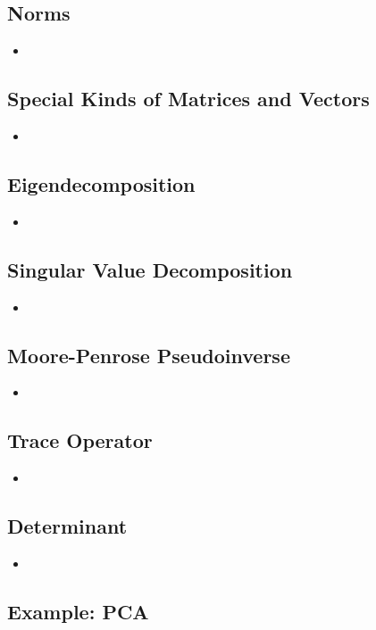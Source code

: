 \subsection{Norms}
\begin{itemize}
    \item 
\end{itemize}

\subsection{Special Kinds of Matrices and Vectors}
\begin{itemize}
    \item 
\end{itemize}

\subsection{Eigendecomposition}
\begin{itemize}
    \item
\end{itemize}

\subsection{Singular Value Decomposition}
\begin{itemize}
    \item
\end{itemize}

\subsection{Moore-Penrose Pseudoinverse}
\begin{itemize}
    \item
\end{itemize}

\subsection{Trace Operator}
\begin{itemize}
    \item
\end{itemize}

\subsection{Determinant}
\begin{itemize}
    \item
\end{itemize}

\subsection{Example: PCA}

